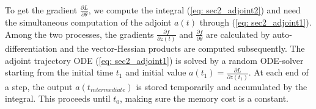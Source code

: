 To get the gradient $\frac{\partial L}{\partial\theta}$, 
we compute the integral (\ref{eq: sec2_adjoint2}) and need the simultaneous computation of the adjoint $a(t)$ through (\ref{eq: sec2_adjoint1}). 
Among the two processes, the gradients $\frac{\partial f}{\partial z(t)}$ and $\frac{\partial f}{\partial\theta}$ are calculated by auto-differentiation 
and the vector-Hessian products are computed subsequently. 
The adjoint trajectory ODE (\ref{eq: sec2_adjoint1}) is solved by a random ODE-solver starting from the initial time $t_1$ and initial value $a(t_1)=\frac{\partial L}{\partial z(t_1)}$. 
At each end of a step, the output $a(t_{intermediate})$ is stored temporarily and accumulated by the integral. 
This proceeds until $t_0$, making sure the memory cost is a constant. 